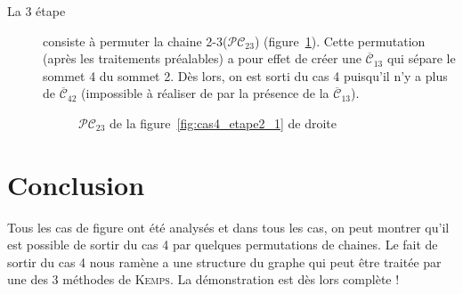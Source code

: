 \documentclass[french]{report}
\begin{document}
\begin{description}
\item[La 3 étape] consiste à permuter la chaine 2-3($\mathcal{PC}_{23}$) (figure~\ref{fig:cas4_etape3}).
Cette permutation (après les traitements préalables) a pour effet de créer une $\overline{\mathcal{C}}_{13}$ qui sépare le sommet 4 du sommet 2.
Dès lors, on est sorti du cas 4 puisqu'il n'y a plus de $\overline{\mathcal{C}}_{42}$ (impossible à réaliser de par la présence de la $\overline{\mathcal{C}}_{13}$).
\begin{figure}[!ht]\centering
	\begin{changemargin}{-3cm}{-3cm}
		\begin{center}
			
		\end{center}
		\end{changemargin}
	\begin{changemargin}{3cm}{0cm}
	\caption{$\mathcal{PC}_{23}$ de la figure~\ref{fig:cas4_etape2_1} de droite}\label{fig:cas4_etape3}
\end{changemargin}	
\end{figure}	
\FloatBarrier


\end{description}	
\section{Conclusion}
Tous les cas de figure ont été analysés et dans tous les cas, on peut montrer qu'il est possible de sortir du cas 4 par quelques permutations de chaines. Le fait de sortir du cas 4 nous ramène a une structure du graphe qui peut être traitée par une des 3 méthodes de \textsc{Kemps}. 
La démonstration est dès lors complète !
\end{document}
